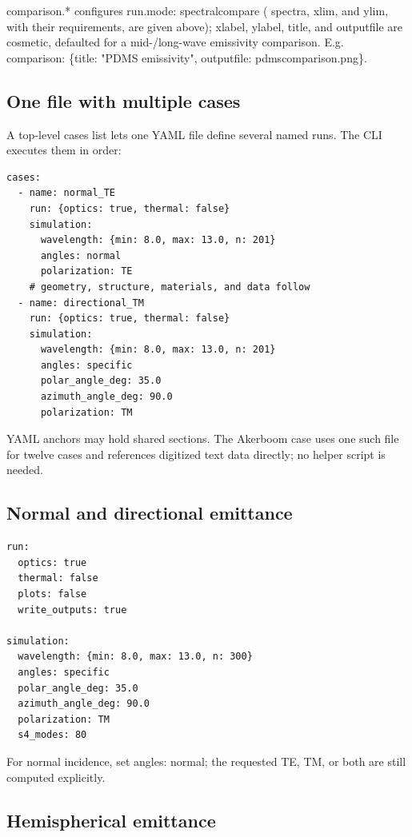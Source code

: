 \documentclass[11pt,a4paper,twoside]{article}
\DeclareRobustCommand{\code}[1]{\begingroup\upshape\ttfamily
  \def\_{\allowbreak\textunderscore\allowbreak}#1\endgroup}
\begin{document}
\code{comparison.*} configures \code{run.mode: spectral\_compare}
(\code{spectra}, \code{xlim}, and \code{ylim}, with their requirements, are
given above); \code{xlabel}, \code{ylabel}, \code{title}, and
\code{output\_file} are cosmetic, defaulted for a mid-/long-wave emissivity
comparison. E.g.\ \code{comparison: \{title: "PDMS emissivity", output\_file:
pdms\_comparison.png\}}.

\subsection{One file with multiple cases}

A top-level \code{cases} list lets one YAML file define several named runs.
The CLI executes them in order:

\begin{lstlisting}
cases:
  - name: normal_TE
    run: {optics: true, thermal: false}
    simulation:
      wavelength: {min: 8.0, max: 13.0, n: 201}
      angles: normal
      polarization: TE
    # geometry, structure, materials, and data follow
  - name: directional_TM
    run: {optics: true, thermal: false}
    simulation:
      wavelength: {min: 8.0, max: 13.0, n: 201}
      angles: specific
      polar_angle_deg: 35.0
      azimuth_angle_deg: 90.0
      polarization: TM
\end{lstlisting}

YAML anchors may hold shared sections. The Akerboom case uses one such file for twelve
cases and references digitized text data directly; no helper script is needed.

\subsection{Normal and directional emittance}

\begin{lstlisting}
run:
  optics: true
  thermal: false
  plots: false
  write_outputs: true

simulation:
  wavelength: {min: 8.0, max: 13.0, n: 300}
  angles: specific
  polar_angle_deg: 35.0
  azimuth_angle_deg: 90.0
  polarization: TM
  s4_modes: 80
\end{lstlisting}

For normal incidence, set \code{angles: normal}; the requested TE, TM, or both
are still computed explicitly.

\subsection{Hemispherical emittance}
\end{document}
